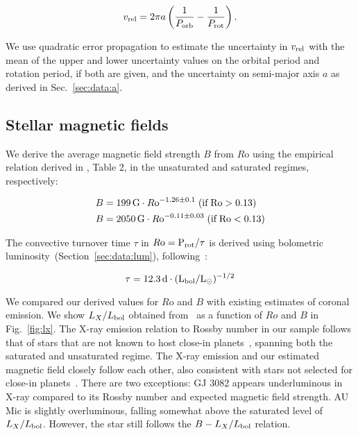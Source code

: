 \documentclass[twocolumn]{aastex631}
\begin{document}
\begin{equation}
    v_{\rm rel} = 2 \pi a \left(\frac{1}{P_{\rm orb}} - \frac{1}{P_{\rm rot}}\right).
\end{equation}

We use quadratic error propagation to estimate the uncertainty in $v_{\rm rel}$ with the mean of the upper and lower uncertainty values on the orbital period and rotation period, if both are given, and the uncertainty on semi-major axis $a$ as derived in Sec.~\ref{sec:data:a}. 

\subsection{Stellar magnetic fields}
\label{sec:methods:bfield}
We derive the average magnetic field strength $B$ from $R$o using the empirical relation derived in \citet{reiners2022magnetism},  Table 2, in the unsaturated and saturated regimes, respectively:

\begin{eqnarray}
    B &= 199\,\text{G} \cdot R\rm o^{-1.26\pm 0.1} \;(\text{if}\; Ro > 0.13) \label{Eq3}\\
    B &= 2050\,\text{G} \cdot R\rm o^{-0.11\pm 0.03} \;(\text{if}\; Ro < 0.13) \label{Eq4}
\end{eqnarray} 

The convective turnover time $\tau$ in  $R \rm o=P_{rot}/\tau$ is derived using bolometric luminosity~(Section~\ref{sec:data:lum}), following~\citet{reiners2014generalized, reiners2022magnetism}:

\begin{equation}
    \tau = 12.3\, \rm d \cdot (L_{\rm bol}/L_\odot)^{-1/2}
\end{equation}

We compared our derived values for $R$o and $B$ with existing estimates of coronal emission. We show $L_X/L_{\rm bol}$ obtained from~\citet{foster2022exoplanet} as a function of $Ro$ and $B$ in Fig.~\ref{fig:lx}. The X-ray emission relation to Rossby number in our sample follows that of stars that are not known to host close-in planets~\citep{wright2011stellaractivityrotation}, spanning both the saturated and unsaturated regime. The X-ray emission and our estimated magnetic field closely follow each other, also consistent with stars not selected for close-in planets~\citep{reiners2022magnetism}. There are two exceptions: GJ 3082 appears underluminous in X-ray compared to its Rossby number and expected magnetic field strength. AU Mic is slightly overluminous, falling somewhat above the saturated level of $L_X/L_{\rm bol}$. However, the star still follows the $B-L_X/L_{\rm bol}$ relation.  
\end{document}
